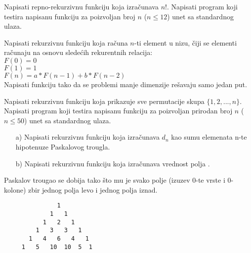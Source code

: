 \begin{Exercise}[label=105]
  Napisati repno-rekurzivnu funkciju koja izračunava $n!$. Napisati program koji testira napisanu funkciju za poizvoljan broj $n$ ($n \le 12$) unet sa standardnog ulaza.
\end{Exercise}
\begin{Answer}[ref=105]
\end{Answer}


\begin{Exercise}[label=106]
 Napisati rekurzivnu funkciju koja računa $n$-ti element u nizu, čiji se elementi računaju na osnovu sledećih rekurentnih relacija:\\
 $F(0) = 0$\\
 $F(1) = 1$\\
 $F(n) = a* F(n-1) + b*F(n-2)$\\
 Napisati funkciju tako da se problemi manje dimenzije rešavaju samo jedan put.
\end{Exercise}
\begin{Answer}[ref=106]
\end{Answer}

\begin{Exercise}[label=107]
Napisati rekurzivnu funkciju koja prikazuje sve permutacije skupa $\{1, 2, ... ,n\}$. Napisati program koji testira napisanu funkciju za poizvoljan prirodan broj $n$ ($n \le 50$) unet sa standardnog ulaza.
\end{Exercise}
\begin{Answer}[ref=107]
\end{Answer}

\begin{Exercise}[label=108]
\begin{itemize}
\item[a)] Napisati rekurzivnu funkciju koja izračunava $d_n$ kao sumu elemenata n-te hipotenuze Paskalovog trougla.
\item[b)] Napisati rekurzivnu funkciju koja izračunava vrednost polja .
\end{itemize}
 Paskalov trougao se dobija tako što mu je svako polje
(izuzev 0-te vrste i 0-kolone) zbir jednog polja levo i
jednog polja iznad.
\begin{verbatim}
               1
             1   1
           1   2   1
         1   3   3   1
       1   4   6   4   1
     1   5   10  10  5  1
\end{verbatim}

\end{Exercise}
\begin{Answer}[ref=108]
\end{Answer}

